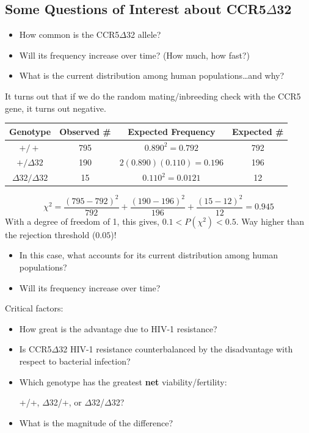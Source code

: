\documentclass[10pt]{article}
\begin{document}
\subsection*{Some Questions of Interest about CCR5$\Delta$32}
\begin{itemize}
	\item How common is the CCR5$\Delta$32 allele?
	\item Will its frequency increase over time?  (How much, how fast?)
	\item What is the current distribution among human populations\dots and why?
\end{itemize}
It turns out that if we do the random mating/inbreeding check with the CCR5 gene, it turns out negative.
\begin{center}
\begin{tabular}{|c|c|c|c|}
    \hline
    Genotype & Observed \# & Expected Frequency & Expected \# \\ \hline
    $+/+$ & 795 & $0.890^2 = 0.792$ & 792 \\ 
    $+/\Delta 32$ & 190 & $2(0.890)(0.110) = 0.196$ & 196 \\
    $\Delta 32 / \Delta 32$ & 15 & $0.110^2 = 0.0121$ & 12 \\ \hline
\end{tabular}
\end{center}
\[\chi^2 = \frac{(795 - 792)^2}{792} + \frac{(190 - 196)^2}{196} + \frac{(15 - 12)^2}{12} = 0.945\]
With a degree of freedom of 1, this gives, $0.1 < P(\chi^2) < 0.5$.  Way higher than the rejection threshold ($0.05$)!
\begin{itemize}
	\item In this case, what accounts for its current distribution among human populations?
	\item Will its frequency increase over time?
\end{itemize}
Critical factors:
\begin{itemize}
	\item How great is the advantage due to HIV-1 resistance?
	\item Is CCR5$\Delta$32 HIV-1 resistance counterbalanced by the disadvantage with respect to bacterial infection?
	\item Which genotype has the greatest \textbf{net} viability/fertility:
	\begin{center}
        +/+, $\Delta$32/+, or $\Delta$32/$\Delta$32?
    \end{center}
    \item What is the magnitude of the difference?
\end{itemize}
\end{document}
